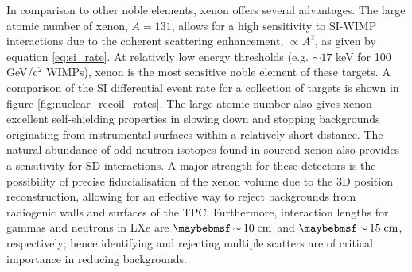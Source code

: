 In comparison to other noble elements, xenon offers several advantages. The large atomic number of xenon, $A=131$, allows for a high sensitivity to SI-WIMP interactions due to the coherent scattering enhancement, $\propto A^2$, as given by equation \ref{eq:si_rate}. At relatively low energy thresholds (e.g. $\sim17$ keV for 100 GeV/c$^2$ WIMPs), xenon is the most sensitive noble element of these targets. A comparison of the SI differential event rate for a collection of targets is shown in figure \ref{fig:nuclear_recoil_rates}. The large atomic number also gives xenon excellent self-shielding properties in slowing down and stopping backgrounds originating from instrumental surfaces within a relatively short distance. The natural abundance of odd-neutron isotopes found in sourced xenon also provides a sensitivity for SD interactions. A major strength for these detectors is the possibility of precise fiducialisation of the xenon volume due to the 3D position reconstruction, allowing for an effective way to reject backgrounds from radiogenic walls and surfaces of the TPC. Furthermore, interaction lengths for gammas and neutrons in LXe are $\sim10 \; \MathText{cm}$ and $\sim15 \; \MathText{cm}$, respectively; hence identifying and rejecting multiple scatters are of critical importance in reducing backgrounds.
%

